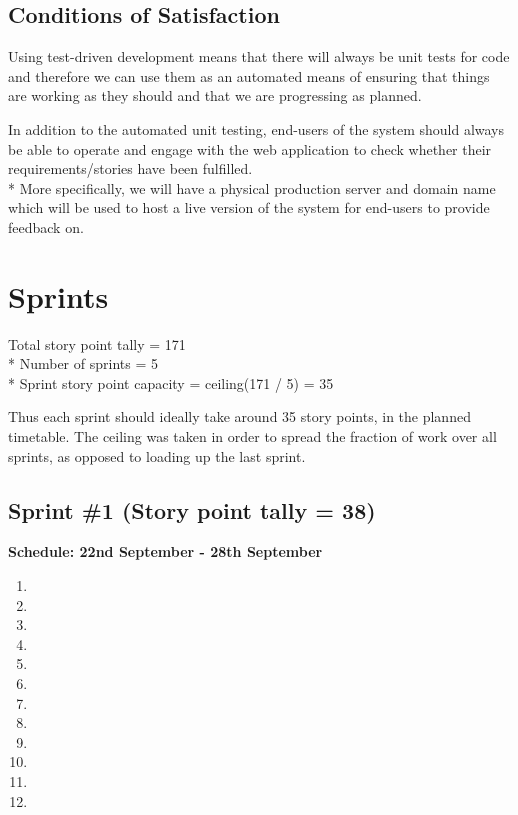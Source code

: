 \documentclass[12pt,titlepage]{article}
\begin{document}
\subsection{Conditions of Satisfaction}
Using test-driven development means that there will always be unit tests for
code and therefore we can use them as an automated means of ensuring that things
are working as they should and that we are progressing as planned.

In addition to the automated unit testing, end-users of the system should always
be able to operate and engage with the web application to check whether their
requirements/stories have been fulfilled. \\*
More specifically, we will have a physical production server and domain name
which will be used to host a live version of the system for end-users to provide
feedback on.

\section{Sprints}
Total story point tally = 171 \\*
Number of sprints = 5 \\*
Sprint story point capacity = ceiling(171 / 5) = 35

Thus each sprint should ideally take around 35 story points, in the planned
timetable. The ceiling was taken in order to spread the fraction of work over
all sprints, as opposed to loading up the last sprint.

\subsection{Sprint \#1 (Story point tally = 38)}
\textbf{Schedule: 22nd September - 28th September}
\begin{enumerate}
   \item \storyOnePointOne{}
   \item \storyOnePointTwo{}
   \item \storyOnePointFour{}
   \item \storyTwoPointTwo{}
   \item \storyTwoPointThree{}
   \item \storyThreePointOne{}
   \item \storyFivePointFour{}
   \item \storyThreePointThree{}
   \item \storyThreePointTwo{}
   \item \storyThreePointFive{}
   \item \storyFourPointOne{}
   \item \storyFourPointTwo{}
\end{enumerate}
\end{document}
